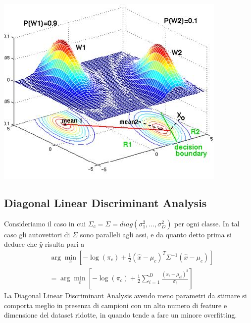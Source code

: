 \documentclass[a4paper,8pt]{article}
\newenvironment{Figure}
  {\par\medskip\noindent\minipage{\linewidth}}
  {\endminipage\par\medskip}
\begin{document}
\begin{multicols}{2}
\begin{Figure}
 \includegraphics[width=\linewidth]{LDA}
\end{Figure}
\subsection{Diagonal Linear Discriminant Analysis}
Consideriamo il caso in cui $\Sigma_c = \Sigma = diag(\sigma_1^2, ..., \sigma_D^2) $ per ogni classe.
In tal caso gli autovettori di $\Sigma$ sono paralleli agli assi, e da quanto detto prima si deduce che $\hat{y}$ risulta pari a
\begin{equation}
\begin{split}
&\arg\min_{c}[-\log{(\pi_{c})}+ \frac{1}{2}(\hat{x} - \mu_{c})^{T}\Sigma^{-1}(\hat{x} - \mu_{c})]\\
&=\arg\min_{c}[-\log{(\pi_{c})}+\frac{1}{2}\sum_{i=1}^{D}\frac{(x_i - \mu_{ci})^2}{\sigma_i}]
\end{split}
\end{equation}
La Diagonal Linear Discriminant Analysis avendo meno parametri da stimare si comporta meglio in presenza di campioni con un alto numero di feature e dimensione del dataset ridotte, in quando tende a fare un minore overfitting.

\end{multicols}
\end{document}
